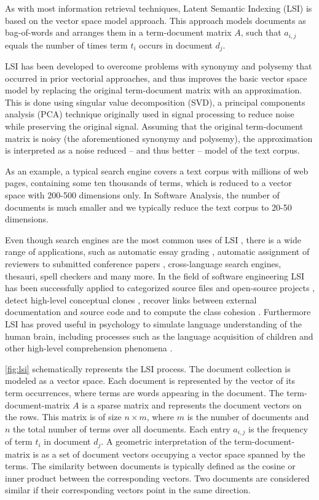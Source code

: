 As with most information retrieval techniques, Latent Semantic Indexing (LSI) is based on the vector space model approach. This approach models documents as bag-of-words and arranges them in a term-document matrix $A$, such that $a_{i,j}$ equals the number of times term $t_i$ occurs in document $d_j$.

LSI has been developed to overcome problems with synonymy and polysemy that occurred in prior vectorial approaches, and thus improves the basic vector space model by replacing the original term-document matrix with an approximation. This is done using singular value decomposition (SVD), a principal components analysis (PCA) technique originally used in signal processing to reduce noise while preserving the original signal. Assuming that the original term-document matrix is noisy (the aforementioned synonymy and polysemy), the approximation is interpreted as a noise reduced -- and thus better -- model of the text corpus.

As an example, a typical search engine covers a text corpus with millions of web pages, containing some ten thousands of terms, which is reduced to a vector space with 200-500 dimensions only. In Software Analysis, the number of documents is much smaller and we typically reduce the text corpus to 20-50 dimensions.

Even though search engines are the most common uses of LSI \cite{Berr94a}, there is a wide range of applications, such as automatic essay grading \cite{Folt99a}, automatic assignment of reviewers to submitted conference papers \cite{Duma92a},  cross-language search engines, thesauri, spell checkers and many more.
In the field of software engineering LSI has been successfully applied to categorized source files \cite{Male00a} and open-source projects \cite{Kawa04a}, detect high-level conceptual clones \cite{Marc01a}, recover links between external documentation and source code \cite{Luci04a,Marc05a} and to compute the class cohesion \cite{Marc05a}. Furthermore LSI has proved useful in psychology to simulate language understanding of the human brain, including processes such as the language acquisition of children and other high-level comprehension phenomena \cite{Land97a}.

\autoref{fig:lsi} schematically represents the LSI process. The document collection is modeled as a vector space. Each document is represented by the vector of its term occurrences, where terms are words appearing in the document. The term-document-matrix $A$ is a sparse matrix and represents the document vectors on the rows. This matrix is of size $n \times m$, where $m$ is the number of documents and $n$ the total number of terms over all documents. Each entry $a_{i,j}$ is the frequency of term $t_i$ in document $d_j$. A geometric interpretation of the term-document-matrix is as a set of document vectors occupying a vector space spanned by the terms. The similarity between documents is typically defined as the cosine or inner product between the corresponding vectors. Two documents are considered similar if their corresponding vectors point in the same direction.

